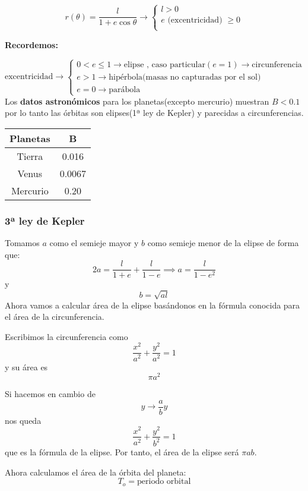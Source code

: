 $$r(\theta) = \frac{l}{1+e\cos\theta} \rightarrow
\begin{cases}
l>0\\
e\text{ (excentricidad) }\ge0\\
\end{cases}
$$

\textbf{Recordemos:}

$$\text{excentricidad} \rightarrow
\begin{cases}
0 < e \leq 1 \rightarrow \text{elipse , caso particular} (e=1) \rightarrow \text{circunferencia}\\
e>1 \rightarrow \text{hipérbola(masas no capturadas por el sol)}\\
e=0 \rightarrow \text{parábola}
\end{cases}
$$
Los \textbf{datos astronómicos} para los planetas(excepto mercurio) muestran $B<0.1$ por lo tanto las órbitas son elipses(1ª ley de Kepler) y parecidas a circunferencias.

\begin{center}
\begin{tabular}{| c | c |}
	\hline
	Planetas & B \\
	\hline
	Tierra & 0.016 \\
	\hline
	Venus & 0.0067 \\
	\hline
	Mercurio & 0.20\\
	\hline
\end{tabular}
\end{center}


\subsubsection{3ª ley de Kepler}
Tomamos $a$ como el semieje mayor y $b$ como semieje menor de la elipse de forma que:
$$2a = \frac{l}{1+e} + \frac{l}{1-e} \implies a= \frac{l}{1-e^2}$$
y
$$b = \sqrt{al}$$
Ahora vamos a calcular área de la elipse basándonos en la fórmula conocida para el área de la circunferencia.

Escribimos la circunferencia como
\[\frac{x^2}{a^2} + \frac{y^2}{a^2} = 1\]
y su área es
\[\pi a^2\]

Si hacemos en cambio de
\[y \rightarrow \frac{a}{b}y\]
nos queda
\[\frac{x^2}{a^2} + \frac{y^2}{b^2} = 1\]
que es la fórmula de la elipse. Por tanto, el área de la elipse será $\pi ab$.

Ahora calculamos el área de la órbita del planeta:
$$T_o = \text{periodo orbital}$$

